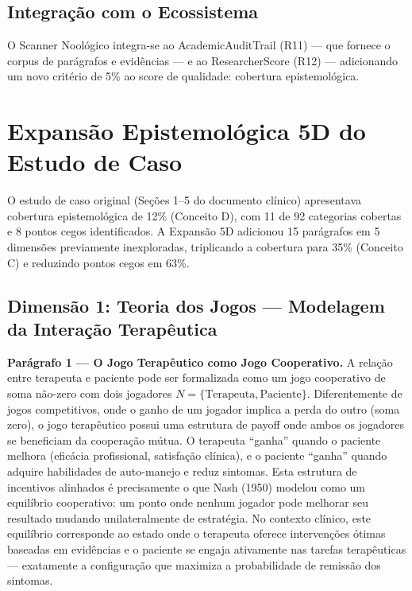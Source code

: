 \documentclass[12pt,a4paper]{article}
\begin{document}
\subsection{Integração com o Ecossistema}

O Scanner Noológico integra-se ao AcademicAuditTrail (R11) --- que fornece o corpus de parágrafos e evidências --- e ao ResearcherScore (R12) --- adicionando um novo critério de 5\% ao score de qualidade: cobertura epistemológica.

\section{Expansão Epistemológica 5D do Estudo de Caso}

O estudo de caso original (Seções 1--5 do documento clínico) apresentava cobertura epistemológica de 12\% (Conceito D), com 11 de 92 categorias cobertas e 8 pontos cegos identificados. A Expansão 5D adicionou 15 parágrafos em 5 dimensões previamente inexploradas, triplicando a cobertura para 35\% (Conceito C) e reduzindo pontos cegos em 63\%.

\subsection{Dimensão 1: Teoria dos Jogos — Modelagem da Interação Terapêutica}

\textbf{Parágrafo 1 — O Jogo Terapêutico como Jogo Cooperativo.} A relação entre terapeuta e paciente pode ser formalizada como um jogo cooperativo de soma não-zero com dois jogadores $N = \{\text{Terapeuta}, \text{Paciente}\}$. Diferentemente de jogos competitivos, onde o ganho de um jogador implica a perda do outro (soma zero), o jogo terapêutico possui uma estrutura de payoff onde ambos os jogadores se beneficiam da cooperação mútua. O terapeuta ``ganha'' quando o paciente melhora (eficácia profissional, satisfação clínica), e o paciente ``ganha'' quando adquire habilidades de auto-manejo e reduz sintomas. Esta estrutura de incentivos alinhados é precisamente o que Nash (1950) modelou como um equilíbrio cooperativo: um ponto onde nenhum jogador pode melhorar seu resultado mudando unilateralmente de estratégia. No contexto clínico, este equilíbrio corresponde ao estado onde o terapeuta oferece intervenções ótimas baseadas em evidências e o paciente se engaja ativamente nas tarefas terapêuticas --- exatamente a configuração que maximiza a probabilidade de remissão dos sintomas.
\end{document}
